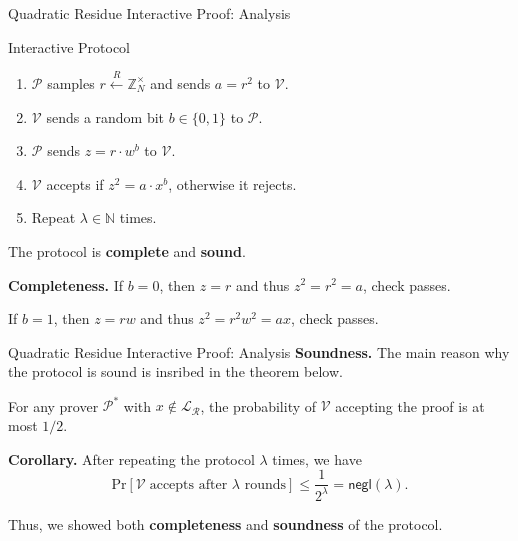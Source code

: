 \documentclass[xcolor={usenames,dvipsnames}]{beamer}
\begin{document}
    \begin{frame}{Quadratic Residue Interactive Proof: Analysis}
        \begin{block}{Interactive Protocol}
            \begin{enumerate}
                \item $\mathcal{P}$ samples $r \xleftarrow{R} \mathbb{Z}_N^{\times}$ and sends $a = r^2$ to $\mathcal{V}$.
                \item $\mathcal{V}$ sends a random bit $b \in \{0,1\}$ to $\mathcal{P}$.
                \item $\mathcal{P}$ sends $z = r \cdot w^b$ to $\mathcal{V}$.
                \item $\mathcal{V}$ accepts if $z^2 = a \cdot x^b$, otherwise it rejects.
                \item Repeat $\lambda \in \mathbb{N}$ times.
            \end{enumerate}
        \end{block}

        \begin{lemma}
            The protocol is \textbf{complete} and \textbf{sound}.
        \end{lemma}

        \textbf{Completeness.} If $b=0$, then $z=r$ and thus $z^2=r^2=a$, check passes.

        If $b=1$, then $z=rw$ and thus $z^2=r^2w^2=ax$, check passes.
    \end{frame}

    \begin{frame}{Quadratic Residue Interactive Proof: Analysis}
        \textbf{Soundness.} The main reason why the protocol is sound is insribed in the theorem below.

        \begin{theorem}
            For any prover $\mathcal{P}^*$ with $x \not\in \mathcal{L}_{\mathcal{R}}$, the probability of $\mathcal{V}$ accepting the proof is at most $1/2$. 
        \end{theorem}

        \textbf{Corollary.} After repeating the protocol $\lambda$ times, we have
        \begin{equation*}
            \text{Pr}[\mathcal{V} \; \text{accepts after $\lambda$ rounds}] \leq \frac{1}{2^{\lambda}} = \mathsf{negl}(\lambda).
        \end{equation*}

        Thus, we showed both \textbf{completeness} and \textbf{soundness} of the protocol.
    \end{frame}
\end{document}
